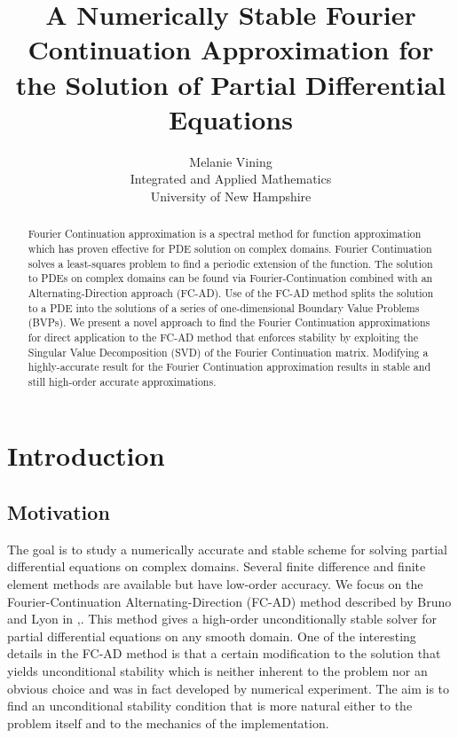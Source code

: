 \documentclass[11pt]{amsart}
\title{A Numerically Stable Fourier Continuation Approximation for the Solution of Partial Differential Equations}
\author{Melanie Vining \\ Integrated and Applied Mathematics \\University of New Hampshire}
\begin{document}
\maketitle
\begin{abstract}
Fourier Continuation approximation is a spectral method for function approximation which has proven effective for PDE solution on complex domains. Fourier Continuation solves a least-squares problem to find a periodic extension of the function.  The solution to PDEs on complex domains can be found via Fourier-Continuation combined with an Alternating-Direction approach (FC-AD).  Use of the FC-AD method splits the solution to a PDE into the solutions of a series of one-dimensional Boundary Value Problems (BVPs).  We present a novel approach to find the Fourier Continuation approximations for direct application to the FC-AD method that enforces stability by exploiting the Singular Value Decomposition (SVD) of the Fourier Continuation matrix. Modifying a highly-accurate result for the Fourier Continuation approximation results in stable and still high-order accurate approximations.   
\end{abstract}
\newpage



\section{Introduction} 
\subsection{Motivation} 
The goal is to study a numerically accurate and stable scheme for solving partial differential equations on complex domains.  Several finite difference and finite element methods are available but have low-order accuracy.  We focus on the Fourier-Continuation Alternating-Direction (FC-AD) method described by Bruno and Lyon in \cite{FCAD1},\cite{FCAD2}. This method gives a high-order unconditionally stable solver for partial differential equations on any smooth domain.  One of the interesting details in the FC-AD method is that a certain modification to the solution that yields unconditional stability which is neither inherent to the problem nor an obvious choice and was in fact developed by numerical experiment. The aim is to find an unconditional stability condition that is more natural either to the problem itself and to the mechanics of the implementation.  
\end{document}
